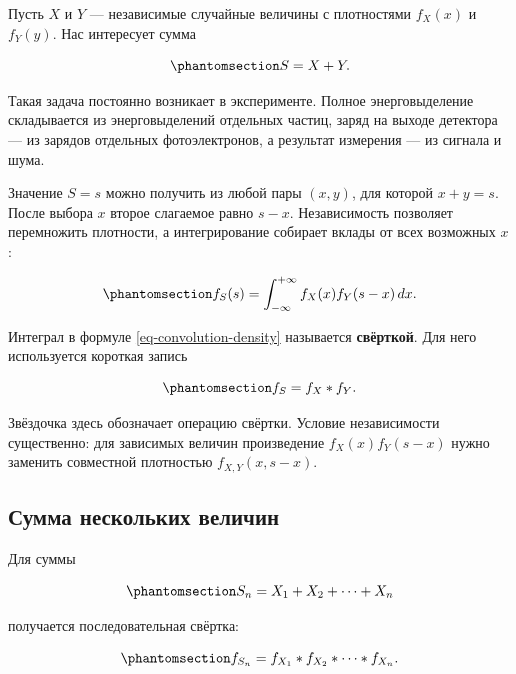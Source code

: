 \documentclass[
  russian,
  11pt,
  a4paper,
  open=any]{scrbook}
\begin{document}
Пусть \(X\) и \(Y\) --- независимые случайные величины с плотностями
\(f_X(x)\) и \(f_Y(y)\). Нас интересует сумма

\begin{equation}\protect\phantomsection\label{eq-sum-two-random-variables}{
S=X+Y.
}\end{equation}

Такая задача постоянно возникает в эксперименте. Полное энерговыделение
складывается из энерговыделений отдельных частиц, заряд на выходе
детектора --- из зарядов отдельных фотоэлектронов, а результат измерения
--- из сигнала и шума.

Значение \(S=s\) можно получить из любой пары \((x,y)\), для которой
\(x+y=s\). После выбора \(x\) второе слагаемое равно \(s-x\).
Независимость позволяет перемножить плотности, а интегрирование собирает
вклады от всех возможных \(x\):

\begin{equation}\protect\phantomsection\label{eq-convolution-density}{
f_S(s)=
\int_{-\infty}^{+\infty}
f_X(x)f_Y(s-x)\,dx.
}\end{equation}

Интеграл в формуле \ref{eq-convolution-density} называется
\textbf{свёрткой}. Для него используется короткая запись

\begin{equation}\protect\phantomsection\label{eq-convolution-notation}{
f_S=f_X*f_Y.
}\end{equation}

Звёздочка здесь обозначает операцию свёртки. Условие независимости
существенно: для зависимых величин произведение \(f_X(x)f_Y(s-x)\) нужно
заменить совместной плотностью \(f_{X,Y}(x,s-x)\).

\subsection{Сумма нескольких
величин}\label{ux441ux443ux43cux43cux430-ux43dux435ux441ux43aux43eux43bux44cux43aux438ux445-ux432ux435ux43bux438ux447ux438ux43d}

Для суммы

\begin{equation}\protect\phantomsection\label{eq-sum-many-random-variables}{
S_n=X_1+X_2+\dots+X_n
}\end{equation}

получается последовательная свёртка:

\begin{equation}\protect\phantomsection\label{eq-convolution-many}{
f_{S_n}=f_{X_1}*f_{X_2}*\cdots*f_{X_n}.
}\end{equation}
\end{document}
